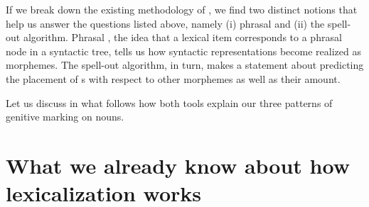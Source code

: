 \begin{sloppypar}

If we break down the existing methodology of , we find two distinct notions that help us answer the questions listed above, namely (i) phrasal  and (ii) the spell-out algorithm. 
Phrasal , the idea that a lexical item corresponds to a phrasal node in a syntactic tree, tells us how syntactic representations become realized as morphemes. The spell-out algorithm, in turn, makes a statement about predicting the placement of s with respect to other morphemes as well as their amount.
\par
Let us discuss in what follows how both tools explain our three patterns of genitive marking on nouns. 



\section{What we already know about how lexicalization works}



\end{sloppypar}
